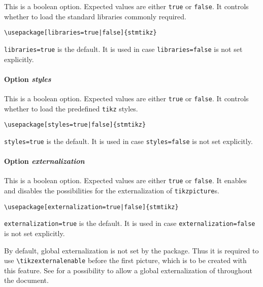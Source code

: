 \documentclass{scrartcl}
\begin{document}
This is a boolean option. Expected values are either \texttt{true} or \texttt{false}. It controls whether to load the standard libraries commonly required.

\begin{verbatim}
\usepackage[libraries=true|false]{stmtikz}
\end{verbatim}

\texttt{libraries=true} is the default. It is used in case \texttt{libraries=false} is not set explicitly.

\paragraph{Option \protect\textit{styles}} 
\label{sec:usage:preamble:wholepackage:options:styles}

This is a boolean option. Expected values are either \texttt{true} or \texttt{false}. It controls whether to load the predefined \texttt{tikz} styles.

\begin{verbatim}
\usepackage[styles=true|false]{stmtikz}
\end{verbatim}

\texttt{styles=true} is the default. It is used in case \texttt{styles=false} is not set explicitly.

\paragraph{Option \protect\textit{externalization}} 
\label{sec:usage:preamble:wholepackage:options:externalization}

This is a boolean option. Expected values are either \texttt{true} or \texttt{false}. It enables and disables the possibilities for the externalization of \texttt{tikzpicture}s.

\begin{verbatim}
\usepackage[externalization=true|false]{stmtikz}
\end{verbatim}

\texttt{externalization=true} is the default. It is used in case \texttt{externalization=false} is not set explicitly.

By default, global externalization is not set by the package. Thus it is required to use \texttt{\textbackslash tikzexternalenable} before the first picture, which is to be created with this feature. See  for a possibility to allow a global externalization of throughout the document.
\end{document}
